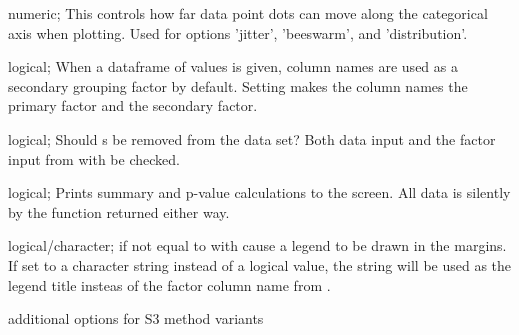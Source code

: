 \documentclass[a4paper]{book}
\begin{document}
\begin{Arguments}
\begin{ldescription}
\item[\code{pointLaneWidth}] numeric; This controls how far data point dots can move along the categorical axis when plotting. Used for  options 'jitter', 'beeswarm', and 'distribution'.

\item[\code{flipFacts}] logical; When a dataframe of values is given, column names are used as a secondary grouping factor by default. Setting  makes the column names the primary factor and  the secondary factor.

\item[\code{na.rm}] logical; Should s be removed from the data set? Both data input and the factor input from  with be checked.

\item[\code{verbose}] logical; Prints summary and p-value calculations to the screen. All data is silently by the function returned either way.

\item[\code{legend}] logical/character; if not equal to  with cause a legend to be drawn in the margins. If set to a character string instead of a logical value, the string will be used as the legend title insteas of the factor column name from .

\item[\code{...}] additional options for S3 method variants
\end{ldescription}
\end{Arguments}
%
\end{document}
